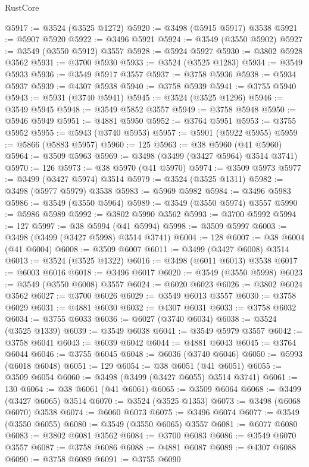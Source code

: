 \begin{lexlean}{RustCore}
\begin{coremodule}
@5917 := @3524 (@3525 @1272)
@5920 := @3498 (@5915 @5917) @3538
@5921 := @5907 @5920
@5922 := @3496 @5921
@5924 := @3549 (@3550 @5902)
@5927 := @3549 (@3550 @5912) @3557
@5928 := @5924 @5927
@5930 := @3802 @5928 @3562
@5931 := @3700 @5930
@5933 := @3524 (@3525 @1283)
@5934 := @3549 @5933
@5936 := @3549 @5917 @3557
@5937 := @3758 @5936
@5938 := @5934 @5937
@5939 := @4307 @5938
@5940 := @3758 @5939
@5941 := @3755 @5940
@5943 := @5931 (@3740 @5941)
@5945 := @3524 (@3525 @1296)
@5946 := @3549 @5945
@5948 := @3549 @5852 @3557
@5949 := @3758 @5948
@5950 := @5946 @5949
@5951 := @4881 @5950
@5952 := @3764 @5951
@5953 := @3755 @5952
@5955 := @5943 (@3740 @5953)
@5957 := @5901 (@5922 @5955)
@5959 := @5866 (@5883 @5957)
@5960 := 125
@5963 := @38 @5960 (@41 @5960)
@5964 := @3509 @5963
@5969 := @3498 (@3499 (@3427 @5964) @3514 @3741)
@5970 := 126
@5973 := @38 @5970 (@41 @5970)
@5974 := @3509 @5973
@5977 := @3499 (@3427 @5974) @3514
@5979 := @3524 (@3525 @1311)
@5982 := @3498 (@5977 @5979) @3538
@5983 := @5969 @5982
@5984 := @3496 @5983
@5986 := @3549 (@3550 @5964)
@5989 := @3549 (@3550 @5974) @3557
@5990 := @5986 @5989
@5992 := @3802 @5990 @3562
@5993 := @3700 @5992
@5994 := 127
@5997 := @38 @5994 (@41 @5994)
@5998 := @3509 @5997
@6003 := @3498 (@3499 (@3427 @5998) @3514 @3741)
@6004 := 128
@6007 := @38 @6004 (@41 @6004)
@6008 := @3509 @6007
@6011 := @3499 (@3427 @6008) @3514
@6013 := @3524 (@3525 @1322)
@6016 := @3498 (@6011 @6013) @3538
@6017 := @6003 @6016
@6018 := @3496 @6017
@6020 := @3549 (@3550 @5998)
@6023 := @3549 (@3550 @6008) @3557
@6024 := @6020 @6023
@6026 := @3802 @6024 @3562
@6027 := @3700 @6026
@6029 := @3549 @6013 @3557
@6030 := @3758 @6029
@6031 := @4881 @6030
@6032 := @4307 @6031
@6033 := @3758 @6032
@6034 := @3755 @6033
@6036 := @6027 (@3740 @6034)
@6038 := @3524 (@3525 @1339)
@6039 := @3549 @6038
@6041 := @3549 @5979 @3557
@6042 := @3758 @6041
@6043 := @6039 @6042
@6044 := @4881 @6043
@6045 := @3764 @6044
@6046 := @3755 @6045
@6048 := @6036 (@3740 @6046)
@6050 := @5993 (@6018 @6048)
@6051 := 129
@6054 := @38 @6051 (@41 @6051)
@6055 := @3509 @6054
@6060 := @3498 (@3499 (@3427 @6055) @3514 @3741)
@6061 := 130
@6064 := @38 @6061 (@41 @6061)
@6065 := @3509 @6064
@6068 := @3499 (@3427 @6065) @3514
@6070 := @3524 (@3525 @1353)
@6073 := @3498 (@6068 @6070) @3538
@6074 := @6060 @6073
@6075 := @3496 @6074
@6077 := @3549 (@3550 @6055)
@6080 := @3549 (@3550 @6065) @3557
@6081 := @6077 @6080
@6083 := @3802 @6081 @3562
@6084 := @3700 @6083
@6086 := @3549 @6070 @3557
@6087 := @3758 @6086
@6088 := @4881 @6087
@6089 := @4307 @6088
@6090 := @3758 @6089
@6091 := @3755 @6090

\end{coremodule}
\end{lexlean}
